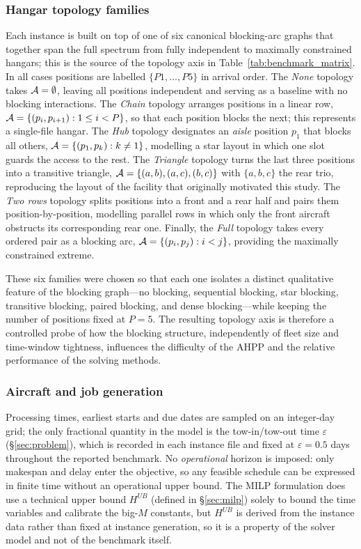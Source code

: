 \subsubsection{Hangar topology families}

Each instance is built on top of one of six canonical blocking-arc graphs
that together span the full spectrum from fully independent to maximally
constrained hangars; this is the source of the topology axis in
Table~\ref{tab:benchmark_matrix}.  In all cases positions are labelled
$\{P1, \dots, P5\}$ in arrival order.  The \emph{None} topology takes
$\mathcal{A} = \emptyset$, leaving all positions independent and serving as a
baseline with no blocking interactions.  The \emph{Chain} topology
arranges positions in a linear row, $\mathcal{A} = \{(p_i, p_{i+1}) : 1 \le i < P\}$,
so that each position blocks the next; this represents a single-file
hangar.  The \emph{Hub} topology designates an \emph{aisle} position $p_1$
that blocks all others, $\mathcal{A} = \{(p_1, p_k) : k \ne 1\}$, modelling a
star layout in which one slot guards the access to the rest.  The
\emph{Triangle} topology turns the last three positions into a transitive
triangle, $\mathcal{A} = \{(a, b), (a, c), (b, c)\}$ with $\{a, b, c\}$ the rear
trio, reproducing the layout of the facility that originally motivated
this study.  The \emph{Two rows} topology splits positions into a front
and a rear half and pairs them position-by-position, modelling parallel
rows in which only the front aircraft obstructs its corresponding rear
one.  Finally, the \emph{Full} topology takes every ordered pair as a
blocking arc, $\mathcal{A} = \{(p_i, p_j) : i < j\}$, providing the maximally
constrained extreme.

These six families were chosen so that each one isolates a distinct
qualitative feature of the blocking graph---no blocking, sequential
blocking, star blocking, transitive blocking, paired blocking, and dense
blocking---while keeping the number of positions fixed at $P = 5$.  The
resulting topology axis is therefore a controlled probe of how the
blocking structure, independently of fleet size and time-window tightness,
influences the difficulty of the AHPP and the relative performance of the
solving methods.

\subsubsection{Aircraft and job generation}

Processing times, earliest starts and due dates are sampled on an
integer-day grid; the only fractional quantity in the model is the
tow-in/tow-out time $\varepsilon$ (\S\ref{sec:problem}), which is recorded
in each instance file and fixed at $\varepsilon = 0.5$ days throughout
the reported benchmark.  No \emph{operational} horizon is imposed: only
makespan and delay enter the objective, so any feasible schedule can be
expressed in finite time without an operational upper bound.  The MILP
formulation does use a technical upper bound $H^{UB}$ (defined in
\S\ref{sec:milp}) solely to bound the time variables and calibrate the
big-$M$ constants, but $H^{UB}$ is derived from the instance data rather
than fixed at instance generation, so it is a property of the solver
model and not of the benchmark itself.

